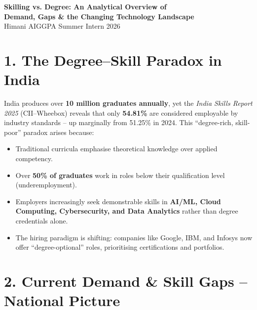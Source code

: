\documentclass[11pt,a4paper]{article}
\begin{document}
\onehalfspacing

\begin{center}
  {\fontsize{12}{14}\selectfont\bfseries\color{navyblue}
  Skilling vs. Degree: An Analytical Overview of\\[2pt]
  Demand, Gaps \& the Changing Technology Landscape}\\[6pt]
  {\small\color{darkgray} Himani \quad\textbar\quad AIGGPA Summer Intern 2026}
\end{center}

\vspace{0.2cm}

\section{1. The Degree--Skill Paradox in India}

India produces over \textbf{10 million graduates annually}, yet the \textit{India Skills Report 2025} (CII--Wheebox) reveals that only \textbf{54.81\%} are considered employable by industry standards -- up marginally from 51.25\% in 2024. This ``degree-rich, skill-poor'' paradox arises because:

\begin{itemize}
  \item Traditional curricula emphasise theoretical knowledge over applied competency.
  \item Over \textbf{50\% of graduates} work in roles below their qualification level (underemployment).
  \item Employers increasingly seek demonstrable skills in \textbf{AI/ML, Cloud Computing, Cybersecurity, and Data Analytics} rather than degree credentials alone.
  \item The hiring paradigm is shifting: companies like Google, IBM, and Infosys now offer ``degree-optional'' roles, prioritising certifications and portfolios.
\end{itemize}

\vspace{0.15cm}
\section{2. Current Demand \& Skill Gaps -- National Picture}
\end{document}
